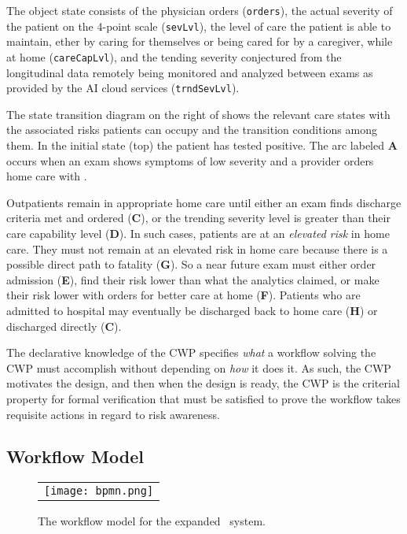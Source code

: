 The object state consists of the physician orders (\texttt{orders}), the actual severity of the patient on the 4-point scale (\texttt{sevLvl}), the level of care the patient is able to maintain, ether by caring for themselves or being cared for by a caregiver, while at home (\texttt{careCapLvl}), and the tending severity conjectured from the longitudinal data remotely being monitored and analyzed between exams as provided by the AI cloud services (\texttt{trndSevLvl}).

The state transition diagram on the right of  shows the relevant care states with the associated risks patients can occupy and the transition conditions among them. In the initial state (top) the patient has tested positive. The arc labeled \textbf{A} occurs when an exam shows symptoms of low severity and a provider orders home care with \phware. 

Outpatients remain in appropriate home care until either an exam finds discharge criteria met and ordered (\textbf{C}), or the trending severity level is greater than their care capability level (\textbf{D}). In such cases, patients are at an \emph{elevated risk} in home care. They must not remain at an elevated risk in home care because there is a possible direct path to fatality (\textbf{G}). So a near future exam must either order admission (\textbf{E}), find their risk lower than what the analytics claimed, or make their risk lower with orders for better care at home (\textbf{F}). Patients who are admitted to hospital may eventually be discharged back to home care (\textbf{H}) or discharged directly (\textbf{C}). 

The declarative knowledge of the CWP specifies \emph{what} a workflow solving the CWP must accomplish without depending on \emph{how} it does it. As such, the CWP motivates the design, and then when the design is ready, the CWP is the criterial property for formal verification that must be satisfied to prove the workflow takes requisite actions in regard to risk awareness.

\subsection{Workflow Model}
\begin{figure*}
  \begin{center}
    \begin{tabular}{c}
      \texttt{[image: bpmn.png]}
    \end{tabular}
  \end{center}
\caption{The workflow model for the expanded \phware\ system.}
\label{fig:bpmn}
\end{figure*}

